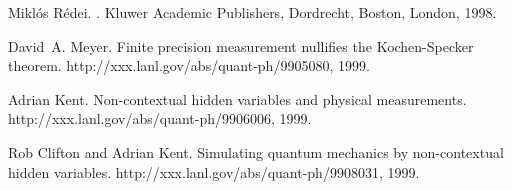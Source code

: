 %
%


\begin{thebibliography}{1}

Mikl{\'{o}}s R{\'{e}}dei.
.
\newblock Kluwer Academic Publishers, Dordrecht, Boston, London, 1998.

David~A. Meyer.
\newblock Finite precision measurement nullifies the {K}ochen-{S}pecker
  theorem.
\newblock http://xxx.lanl.gov/abs/quant-ph/9905080, 1999.

Adrian Kent.
\newblock Non-contextual hidden variables and physical measurements.
\newblock http://xxx.lanl.gov/abs/quant-ph/9906006, 1999.

Rob Clifton and Adrian Kent.
\newblock Simulating quantum mechanics by non-contextual hidden variables.
\newblock http://xxx.lanl.gov/abs/quant-ph/9908031, 1999.

\end{thebibliography}


